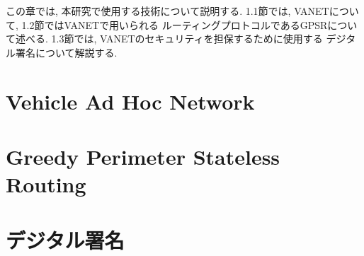 この章では, 本研究で使用する技術について説明する. 
1.1節では, VANETについて, 1.2節ではVANETで用いられる
ルーティングプロトコルであるGPSRについて述べる. 
1.3節では, VANETのセキュリティを担保するために使用する
デジタル署名について解説する.

\section{Vehicle Ad Hoc Network}

\section{Greedy Perimeter Stateless Routing}

\section{デジタル署名}

